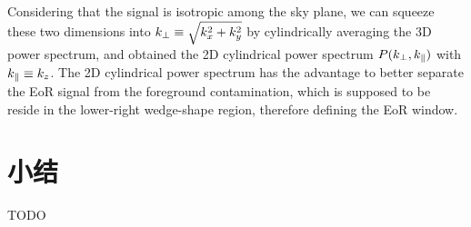 Considering that the signal is isotropic among the sky plane, we can
squeeze these two dimensions into $\text{$k_{\bot}$} \equiv \sqrt{k_x^2 + k_y^2}$ by
cylindrically averaging the 3D power spectrum, and obtained the 2D
cylindrical power spectrum $P(\text{$k_{\bot}$}, \text{$k_{\parallel}$})$ with $\text{$k_{\parallel}$} \equiv k_z$.
The 2D cylindrical power spectrum has the advantage to better separate
the EoR signal from the foreground contamination, which is supposed to
be reside in the lower-right wedge-shape region, therefore defining the
EoR window.


\section{小结}

TODO


